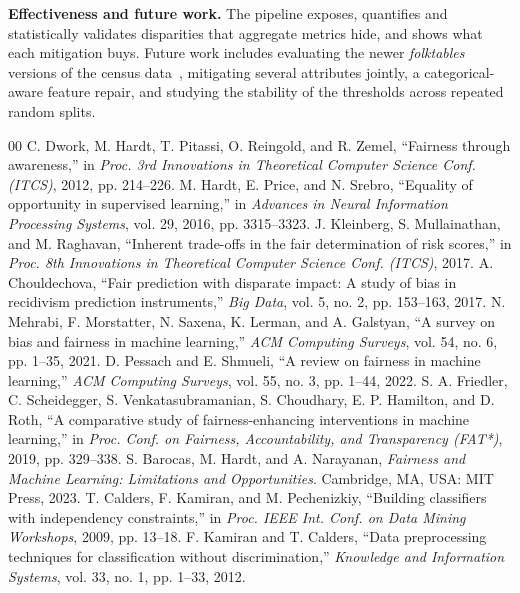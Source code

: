 \documentclass[conference]{IEEEtran}
\begin{document}
\textbf{Effectiveness and future work.} The pipeline exposes, quantifies and statistically validates disparities that aggregate metrics hide, and shows what each mitigation buys. Future work includes evaluating the newer \emph{folktables} versions of the census data~\cite{ding2021}, mitigating several attributes jointly, a categorical-aware feature repair, and studying the stability of the thresholds across repeated random splits.

\begin{thebibliography}{00}
 C. Dwork, M. Hardt, T. Pitassi, O. Reingold, and R. Zemel, ``Fairness through awareness,'' in \textit{Proc. 3rd Innovations in Theoretical Computer Science Conf. (ITCS)}, 2012, pp. 214--226.
 M. Hardt, E. Price, and N. Srebro, ``Equality of opportunity in supervised learning,'' in \textit{Advances in Neural Information Processing Systems}, vol. 29, 2016, pp. 3315--3323.
 J. Kleinberg, S. Mullainathan, and M. Raghavan, ``Inherent trade-offs in the fair determination of risk scores,'' in \textit{Proc. 8th Innovations in Theoretical Computer Science Conf. (ITCS)}, 2017.
 A. Chouldechova, ``Fair prediction with disparate impact: A study of bias in recidivism prediction instruments,'' \textit{Big Data}, vol. 5, no. 2, pp. 153--163, 2017.
 N. Mehrabi, F. Morstatter, N. Saxena, K. Lerman, and A. Galstyan, ``A survey on bias and fairness in machine learning,'' \textit{ACM Computing Surveys}, vol. 54, no. 6, pp. 1--35, 2021.
 D. Pessach and E. Shmueli, ``A review on fairness in machine learning,'' \textit{ACM Computing Surveys}, vol. 55, no. 3, pp. 1--44, 2022.
 S. A. Friedler, C. Scheidegger, S. Venkatasubramanian, S. Choudhary, E. P. Hamilton, and D. Roth, ``A comparative study of fairness-enhancing interventions in machine learning,'' in \textit{Proc. Conf. on Fairness, Accountability, and Transparency (FAT*)}, 2019, pp. 329--338.
 S. Barocas, M. Hardt, and A. Narayanan, \textit{Fairness and Machine Learning: Limitations and Opportunities}. Cambridge, MA, USA: MIT Press, 2023.
 T. Calders, F. Kamiran, and M. Pechenizkiy, ``Building classifiers with independency constraints,'' in \textit{Proc. IEEE Int. Conf. on Data Mining Workshops}, 2009, pp. 13--18.
 F. Kamiran and T. Calders, ``Data preprocessing techniques for classification without discrimination,'' \textit{Knowledge and Information Systems}, vol. 33, no. 1, pp. 1--33, 2012.

\end{thebibliography}
\end{document}
